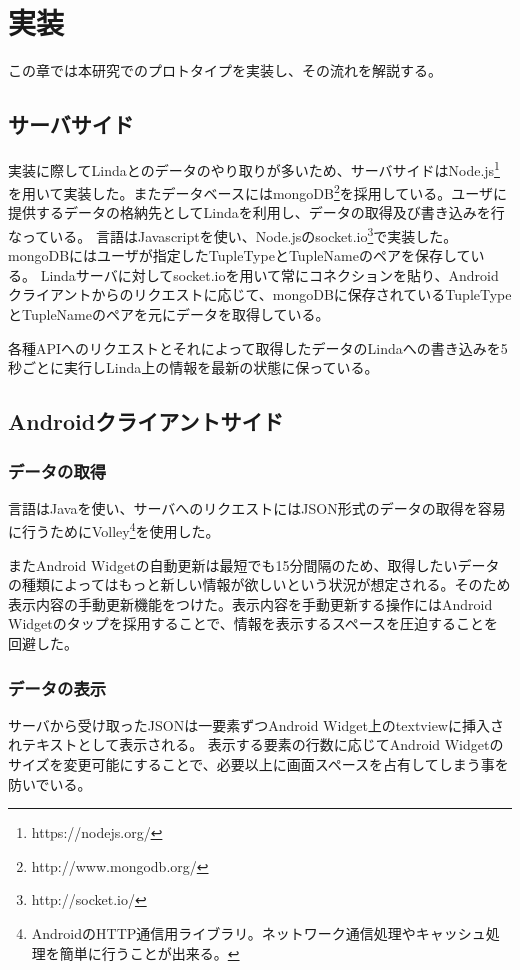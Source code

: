 \chapter{実装}
\label{chap:prototype}

この章では本研究でのプロトタイプを実装し、その流れを解説する。

\section{サーバサイド}
実装に際してLindaとのデータのやり取りが多いため、サーバサイドはNode.js\footnote{https://nodejs.org/}を用いて実装した。またデータベースにはmongoDB\footnote{http://www.mongodb.org/}を採用している。ユーザに提供するデータの格納先としてLindaを利用し、データの取得及び書き込みを行なっている。
言語はJavascriptを使い、Node.jsのsocket.io\footnote{http://socket.io/}で実装した。
mongoDBにはユーザが指定したTupleTypeとTupleNameのペアを保存している。
Lindaサーバに対してsocket.ioを用いて常にコネクションを貼り、Androidクライアントからのリクエストに応じて、mongoDBに保存されているTupleTypeとTupleNameのペアを元にデータを取得している。

各種APIへのリクエストとそれによって取得したデータのLindaへの書き込みを5秒ごとに実行しLinda上の情報を最新の状態に保っている。

\section{Androidクライアントサイド}
\subsection{データの取得}
言語はJavaを使い、サーバへのリクエストにはJSON形式のデータの取得を容易に行うためにVolley\footnote{AndroidのHTTP通信用ライブラリ。ネットワーク通信処理やキャッシュ処理を簡単に行うことが出来る。}を使用した。

またAndroid Widgetの自動更新は最短でも15分間隔のため、取得したいデータの種類によってはもっと新しい情報が欲しいという状況が想定される。そのため表示内容の手動更新機能をつけた。表示内容を手動更新する操作にはAndroid Widgetのタップを採用することで、情報を表示するスペースを圧迫することを回避した。

\subsection{データの表示}
サーバから受け取ったJSONは一要素ずつAndroid Widget上のtextviewに挿入されテキストとして表示される。
表示する要素の行数に応じてAndroid Widgetのサイズを変更可能にすることで、必要以上に画面スペースを占有してしまう事を防いでいる。

